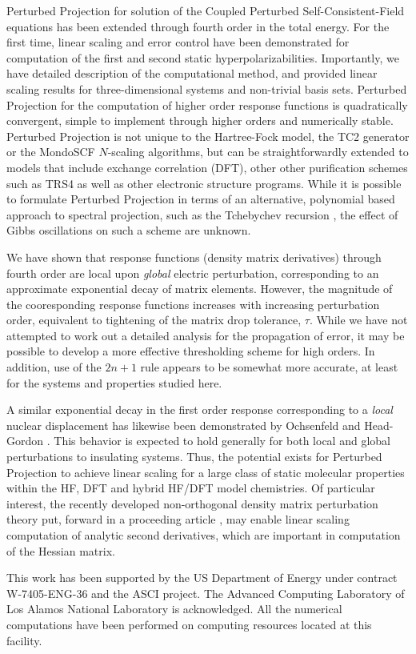 \documentclass[prl,aps,letterpaper,twocolumn,showpacs,twocolumngrid,superbib]{revtex4}
\begin{document}
Perturbed Projection for solution of the Coupled Perturbed Self-Consistent-Field 
equations has been extended through fourth order in the total energy.  For the first time,
linear scaling and error control have been demonstrated for computation of the first
and second static hyperpolarizabilities.  Importantly, we have detailed 
description of the computational method, and provided linear scaling results for 
three-dimensional systems and non-trivial basis sets.  Perturbed Projection for the 
computation of higher order response functions is quadratically convergent, simple 
to implement through higher orders and numerically stable.  Perturbed Projection is 
not unique to the Hartree-Fock model, the TC2 generator or the {\sc MondoSCF} 
$N$-scaling algorithms, but can be straightforwardly extended to models that include 
exchange correlation (DFT), other other purification schemes such as TRS4 \cite{ANiklasson03}
as well as other electronic structure programs.  While it is possible to formulate 
Perturbed Projection in terms of an alternative, polynomial based approach to spectral projection, 
such as the Tchebychev recursion \cite{AVoter96}, the effect of Gibbs oscillations on such a scheme 
are unknown.

We have shown that response functions (density matrix derivatives) through fourth 
order are local upon {\em global} electric perturbation, corresponding to an 
approximate exponential decay of matrix elements.  However, the magnitude of the 
cooresponding response functions increases with increasing perturbation order, equivalent 
to tightening of the matrix drop tolerance, $\tau$.   While we have not attempted to 
work out a detailed analysis for the propagation of error, it may be possible 
to develop a more effective thresholding scheme for high orders. In addition, 
use of the $2 n+1$ rule appears to be somewhat more accurate, at least for the 
systems and properties studied here.

A similar exponential decay in the first order response corresponding to a {\em local} nuclear 
displacement has likewise been demonstrated by Ochsenfeld and Head-Gordon \cite{Ochsenfeld97}. 
This behavior is expected to hold generally for both local and global perturbations to 
insulating systems.  Thus, the potential exists for Perturbed Projection to achieve linear scaling
for a large class of static molecular properties within the HF, DFT and hybrid HF/DFT model 
chemistries. Of particular interest, the recently developed non-orthogonal density matrix perturbation 
theory put, forward in a proceeding article \cite{ANiklasson05a}, may enable linear scaling computation of analytic 
second derivatives, which are important in computation of the Hessian matrix.  

\begin{acknowledgments}
 This work has been supported by the US Department of Energy 
 under contract W-7405-ENG-36 and the ASCI project.  
 The Advanced Computing Laboratory of Los 
 Alamos National Laboratory is acknowledged.
 All the numerical computations have been
 performed on computing resources located at this facility.
\end{acknowledgments}


\end{document}
